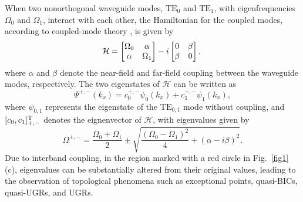\documentclass[%
 reprint,
superscriptaddress,
 amsmath,amssymb, aps,
]{revtex4-1}
\begin{document}
When two nonorthogonal waveguide modes, $\mathrm{TE}_{0}$ and $\mathrm{TE}_{1}$, with eigenfrequencies $\Omega_0$ and $\Omega_1$, interact with each other, the Hamiltonian for the coupled modes, according to coupled-mode theory \cite{WSuh2004,SGLee2020-1}, is given by
\begin{equation}\label{Hamiltonian}
\mathcal{H} = \left [ \begin{matrix} \Omega_{0} & \alpha  \\ \alpha  & \Omega_{1} \\ \end{matrix} \right ] -i \left [\begin{matrix} 0 & \beta \\ \beta & 0 \\ \end{matrix} \right], \\
\end{equation} 	 	
where $\alpha$ and $\beta$ denote the near-field and far-field coupling between the waveguide modes, respectively. The two eigenstates of $\mathcal{H}$ can be written as 
\begin{equation} \label{eigenstates}
\Psi^{+,-}(k_x) = c^{+,-}_0 \psi_0(k_x) + c^{+,-}_1 \psi_1(k_x),
\end{equation} 	 	
where $\psi_{0,1}$ represents the eigenstate of the $\mathrm{TE}_{0,1}$ mode without coupling, and $[c_{0}, c_{1}]^{\rm{T}}_{+,-}$ denotes the eignenvector of $\mathcal{H}$, with eigenvalues given by
\begin{equation}\label{eigenvalue}
\Omega^{+,-} = \frac{\Omega_0+\Omega_1}{2}\pm\sqrt{\frac{\left ( \Omega_0-\Omega_1\right )^2}{4}  + (\alpha - i \beta)^2}.
\end{equation} 	
Due to interband coupling, in the region marked with a red circle in Fig.~\ref{fig1}(c), eigenvalues can be substantially altered from their original values, leading to the observation of topological phenomena such as exceptional points, quasi-BICs, quasi-UGRs, and UGRs.
\end{document}
